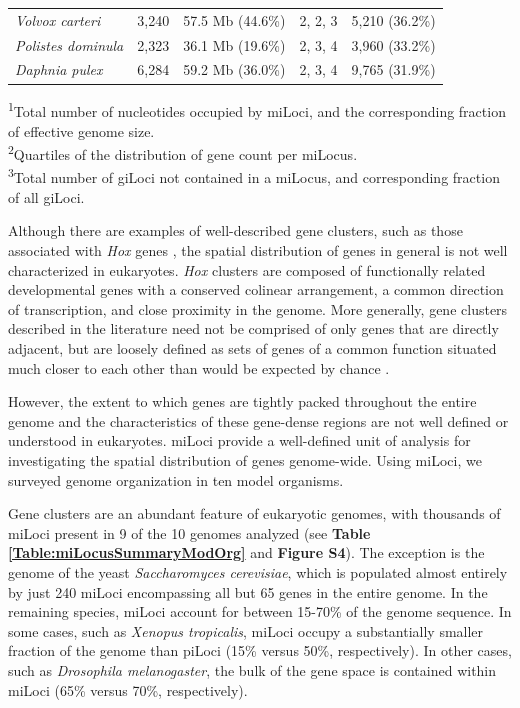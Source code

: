 \begin{table}
\begin{tabularx}{\textwidth}{lrrrr}
\textit{Volvox carteri}             &                3,240 &             57.5 Mb (44.6\%) &                       2, 2, 3 &                5,210 (36.2\%)  \\
\textit{Polistes dominula}          &                2,323 &             36.1 Mb (19.6\%) &                       2, 3, 4 &                3,960 (33.2\%)  \\
\textit{Daphnia pulex}              &                6,284 &             59.2 Mb (36.0\%) &                       2, 3, 4 &                9,765 (31.9\%)  \\ \hline
\end{tabularx}
\raggedright
{\scriptsize
\textsuperscript{1}Total number of nucleotides occupied by miLoci, and the corresponding fraction of effective genome size. \\
\textsuperscript{2}Quartiles of the distribution of gene count per miLocus. \\
\textsuperscript{3}Total number of giLoci not contained in a miLocus, and corresponding fraction of all giLoci.
}
\end{table}

Although there are examples of well-described gene clusters, such as those associated with \textit{Hox} genes \cite{HoxClusters}, the spatial distribution of genes in general is not well characterized in eukaryotes.
\textit{Hox} clusters are composed of functionally related developmental genes with a conserved colinear arrangement, a common direction of transcription, and close proximity in the genome.
More generally, gene clusters described in the literature need not be comprised of only genes that are directly adjacent, but are loosely defined as sets of genes of a common function situated much closer to each other than would be expected by chance \cite{ClusterFunc}.

However, the extent to which genes are tightly packed throughout the entire genome and the characteristics of these gene-dense regions are not well defined or understood in eukaryotes.
miLoci provide a well-defined unit of analysis for investigating the spatial distribution of genes genome-wide.
Using miLoci, we surveyed genome organization in ten model organisms.

Gene clusters are an abundant feature of eukaryotic genomes, with thousands of miLoci present in 9 of the 10 genomes analyzed (see \textbf{Table \ref{Table:miLocusSummaryModOrg}} and \textbf{Figure S4}).
The exception is the genome of the yeast \textit{Saccharomyces cerevisiae}, which is populated almost entirely by just 240 miLoci encompassing all but 65 genes in the entire genome.
In the remaining species, miLoci account for between 15-70\% of the genome sequence.
In some cases, such as \textit{Xenopus tropicalis}, miLoci occupy a substantially smaller fraction of the genome than piLoci (15\% versus 50\%, respectively).
In other cases, such as \textit{Drosophila melanogaster}, the bulk of the gene space is contained within miLoci (65\% versus 70\%, respectively).

